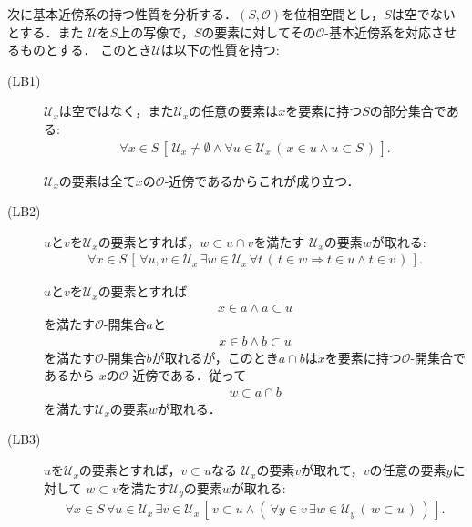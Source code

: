	次に基本近傍系の持つ性質を分析する．$(S,\mathscr{O})$を位相空間とし，$S$は空でないとする．また
	$\mathcal{U}$を$S$上の写像で，$S$の要素に対してその$\mathscr{O}$-基本近傍系を対応させるものとする．
	このとき$\mathcal{U}$は以下の性質を持つ:
	\begin{description}
		\item[(LB1)] $\mathcal{U}_{x}$は空ではなく，また$\mathcal{U}_{x}$の任意の要素は$x$を要素に持つ$S$の部分集合である:
			\begin{align}
				\forall x \in S\, \left[\, \mathcal{U}_{x} \neq \emptyset 
				\wedge \forall u \in \mathcal{U}_{x}\, (\, x \in u \wedge u \subset S\, )\, \right].
			\end{align}
			
			\begin{sketch}
				$\mathscr{U}_{x}$の要素は全て$x$の$\mathscr{O}$-近傍であるからこれが成り立つ．
				\QED
			\end{sketch}
			
		\item[(LB2)] $u$と$v$を$\mathcal{U}_{x}$の要素とすれば，$w \subset u \cap v$を満たす
			$\mathcal{U}_{x}$の要素$w$が取れる:
			\begin{align}
				\forall x \in S\, 
				\left[\, \forall u,v \in \mathcal{U}_{x}\, \exists w \in \mathcal{U}_{x}\,
				\forall t\, \left(\, t \in w \Longrightarrow t \in u \wedge t \in v\, \right)\, \right].
			\end{align}
			
			\begin{sketch}
				$u$と$v$を$\mathcal{U}_{x}$の要素とすれば
				\begin{align}
					x \in a \wedge a \subset u
				\end{align}
				を満たす$\mathscr{O}$-開集合$a$と
				\begin{align}
					x \in b \wedge b \subset u
				\end{align}
				を満たす$\mathscr{O}$-開集合$b$が取れるが，このとき$a \cap b$は$x$を要素に持つ$\mathscr{O}$-開集合であるから
				$x$の$\mathscr{O}$-近傍である．従って
				\begin{align}
					w \subset a \cap b
				\end{align}
				を満たす$\mathcal{U}_{x}$の要素$w$が取れる．
				\QED
			\end{sketch}
			
		\item[(LB3)] $u$を$\mathcal{U}_{x}$の要素とすれば，$v \subset u$なる
			$\mathcal{U}_{x}$の要素$v$が取れて，$v$の任意の要素$y$に対して
			$w \subset v$を満たす$\mathcal{U}_{y}$の要素$w$が取れる:
			\begin{align}
				\forall x \in S\, \forall u \in \mathcal{U}_{x}\, \exists v \in \mathcal{U}_{x}\,
				\left[\, v \subset u \wedge \left(\, \forall y \in v\,
				\exists w \in \mathcal{U}_{y}\, (\, w \subset u\, )\, \right)\, \right].
			\end{align}
			

\end{description}

